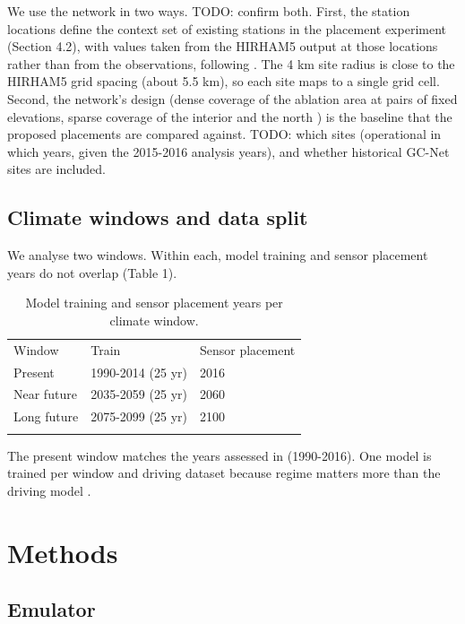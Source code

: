 \documentclass[tc, manuscript]{copernicus}
\begin{document}
We use the network in two ways. TODO: confirm both. First, the station
locations define the context set of existing stations in the placement
experiment (Section 4.2), with values taken from the HIRHAM5 output at
those locations rather than from the observations, following
\citet{andersson2023}. The 4 km site radius is close to the HIRHAM5 grid
spacing (about 5.5 km), so each site maps to a single grid cell. Second,
the network's design (dense coverage of the ablation area at pairs of
fixed elevations, sparse coverage of the interior and the north
\citep{wang2026_essd}) is the baseline that the proposed placements are
compared against. TODO: which sites (operational in which years, given
the 2015-2016 analysis years), and whether historical GC-Net sites are
included.

\subsection{Climate windows and data
split}\label{climate-windows-and-data-split}

We analyse two windows. Within each, model training and sensor placement
years do not overlap (Table 1).

\begin{table}[t]
\caption{Model training and sensor placement years per climate window.}
\begin{tabular}{lll}
\tophline
Window & Train & Sensor placement \\
\middlehline
Present & 1990-2014 (25 yr) & 2016 \\
Near future & 2035-2059 (25 yr) & 2060 \\
Long future & 2075-2099 (25 yr) & 2100 \\
\bottomhline
\end{tabular}
\belowtable{}
\end{table}

The present window matches the years assessed in
\citet{schlager_preprint} (1990-2016). One model is trained per window
and driving dataset because regime matters more than the driving model
\citep{schlager_preprint}.

\section{Methods}\label{methods}

\subsection{Emulator}\label{emulator}
\end{document}
